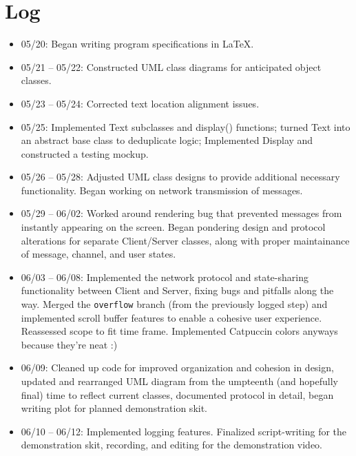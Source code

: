 \documentclass{article}
\begin{document}
\section{Log}
\begin{itemize}
    \item 05/20: Began writing program specifications in \LaTeX.
    \item 05/21 -- 05/22: Constructed UML class diagrams for anticipated object classes.
    \item 05/23 -- 05/24: Corrected text location alignment issues.
    \item 05/25: Implemented Text subclasses and display() functions; turned Text into an abstract base class to deduplicate logic; Implemented Display and constructed a testing mockup.
    \item 05/26 -- 05/28: Adjusted UML class designs to provide additional necessary functionality. Began working on network transmission of messages.
    \item 05/29 -- 06/02: Worked around rendering bug that prevented messages from instantly appearing on the screen. Began pondering design and protocol alterations for separate Client/Server classes, along with proper maintainance of message, channel, and user states.
    \item 06/03 -- 06/08: Implemented the network protocol and state-sharing functionality between Client and Server, fixing bugs and pitfalls along the way. Merged the \verb|overflow| branch (from the previously logged step) and implemented scroll buffer features to enable a cohesive user experience. Reassessed scope to fit time frame. Implemented Catpuccin colors anyways because they're neat :)
    \item 06/09: Cleaned up code for improved organization and cohesion in design, updated and rearranged UML diagram from the umpteenth (and hopefully final) time to reflect current classes, documented protocol in detail, began writing plot for planned demonstration skit.
    \item 06/10 -- 06/12: Implemented logging features. Finalized script-writing for the demonstration skit, recording, and editing for the demonstration video.
\end{itemize}
\end{document}
